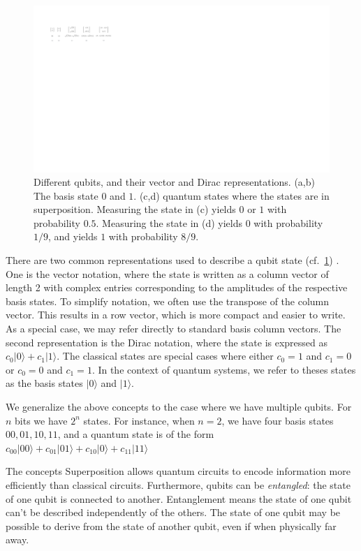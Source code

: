 \begin{figure}
\includegraphics[scale=0.85]{figures/States/states}
\caption{Different qubits, and their vector and Dirac representations.
(a,b) The basis state $0$ and $1$.
(c,d) quantum states where the states are in superposition.
%
Measuring the state in (c) yields $0$ or $1$ with probability $0.5$.
%
Measuring the state in (d) yields $0$ with probability $1/9$, and yields $1$ with probability $8/9$.
}
\label{qbit:state:fig}
\end{figure}
There are two common representations used to describe a qubit state (cf.\ \cref{qbit:state:fig}) .
%
One is the vector notation, where the state is written as a column vector of length 2 with complex entries corresponding to the amplitudes of the respective basis states.
%
To simplify notation, we often use the transpose of the column vector.
%
This results in a row vector, which is more compact and easier to write.
%
As a special case, we may refer directly to standard basis column vectors.
%
The second representation is the Dirac notation, where the state is expressed as $c_0|0\rangle + c_1|1\rangle$.
%
The classical states are special cases where either $c_0=1$ and $c_1=0$ or
$c_0=0$ and $c_1=1$.
%
In the context of quantum systems, we refer to theses states as the basis states $|0\rangle$ and $|1\rangle$.

We generalize the above concepts to the case where we have multiple qubits.
%
For $n$ bits we have $2^n$ states.
%
For instance, when $n=2$, we have four basis states $00,01,10,11$, and a quantum state is of the form $c_{00}|00\rangle+c_{01}|01\rangle+c_{10}|0\rangle+c_{11}|11\rangle$

The concepts
Superposition allows quantum circuits to encode information more efficiently than classical circuits. 
%
Furthermore, qubits can be {\it entangled}: the state of one qubit is connected to another. 
%
Entanglement means the state of one qubit can't be described independently of the others.
%
The state of one qubit may be possible to derive from the state of another qubit, even if when physically far away.


